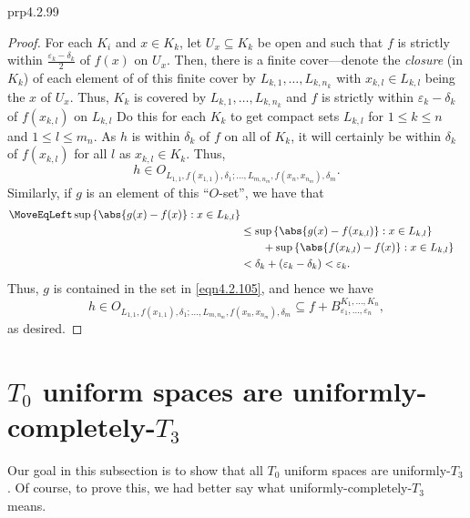 \begin{prp}{}{prp4.2.99}
\begin{proof}
		For each $K_i$ and $x\in K_k$, let $U_x\subseteq K_k$ be open and such that $f$ is strictly within $\tfrac{\varepsilon _k-\delta _k}{2}$ of $f(x)$ on $U_x$.  Then, there is a finite cover---denote the \emph{closure} (in $K_k$) of each element of of this finite cover by $L_{k,1},\ldots ,L_{k,n_k}$ with $x_{k,l}\in L_{k,l}$ being the $x$ of $U_x$.  Thus, $K_k$ is covered by $L_{k,1},\ldots ,L_{k,n_k}$ and $f$ is strictly within $\varepsilon _k-\delta _k$ of $f(x_{k,l})$ on $L_{k,l}$  Do this for each $K_k$ to get compact sets $L_{k,l}$ for $1\leq k\leq n$ and $1\leq l\leq m_n$.  As $h$ is within $\delta _k$ of $f$ on all of $K_k$, it will certainly be within $\delta _k$ of $f(x_{k,l})$ for all $l$ as $x_{k,l}\in K_k$.  Thus,
		\begin{equation}\label{2.4.11}
			h\in O_{L_{1,1},f(x_{1,1}),\delta _1;\ldots ,L_{m,n_m},f(x_n,x_{n_m}),\delta _m}.
		\end{equation}
		Similarly, if $g$ is an element of this ``$O$-set'', we have that
		\begin{equation}
			\begin{split}
				\MoveEqLeft
				\sup \left\{ \abs{g(x)-f(x)}:x\in L_{k,l}\right\} \\
				& \leq \sup \left\{ \abs{g(x)-f(x_{k,l})}:x\in L_{k,l}\right\} \\ & \qquad +\sup \left\{ \abs{f(x_{k,l})-f(x)}:x\in L_{k,l}\right\} \\
				& <\delta _k+(\varepsilon _k-\delta _k)<\varepsilon _k.
			\end{split}
		\end{equation}
		Thus, $g$ is contained in the set in \eqref{eqn4.2.105}, and hence we have
		\begin{equation*}
			h\in O_{L_{1,1},f(x_{1,1}),\delta _1;\ldots ,L_{m,n_m},f(x_n,x_{n_m}),\delta _m}\subseteq f+B_{\varepsilon _1,\ldots ,\varepsilon _n}^{K_1,\ldots ,K_n},
		\end{equation*}
		as desired.
	\end{proof}
\end{prp}

\section[\texorpdfstring{$T_0$}{T0} uni.~spaces are uni.-completely-\texorpdfstring{$T_3$}{T3}]{\texorpdfstring{$T_0$}{T0} uniform spaces are uniformly-completely-\texorpdfstring{$T_3$}{T3}}

Our goal in this subsection is to show that all $T_0$ uniform spaces are uniformly-$T_3$.  Of course, to prove this, we had better say what uniformly-completely-$T_3$ means.


